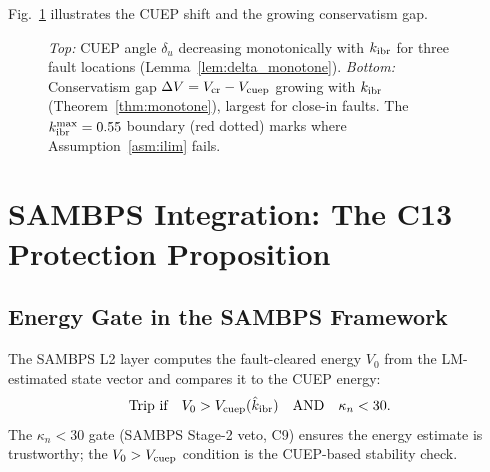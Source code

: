 \documentclass[journal]{IEEEtran}
\newcommand{\kibr}{k_{\rm ibr}}
\newcommand{\kappan}{\kappa_{n}}
\newcommand{\Vcuep}{V_{\rm cuep}}
\newcommand{\Vcr}{V_{\rm cr}}
\newcommand{\Vnaught}{V_0}
\newcommand{\deltau}{\delta_u}
\newcommand{\DeltaV}{\Delta V}
\begin{document}
Fig.~\ref{fig:cuep_shift} illustrates the CUEP shift and the
growing conservatism gap.

\begin{figure}[!t]
  \centering
  
  \caption{\emph{Top:} CUEP angle $\deltau$ decreasing monotonically
           with $\kibr$ for three fault locations (Lemma~\ref{lem:delta_monotone}).
           \emph{Bottom:} Conservatism gap $\DeltaV = \Vcr - \Vcuep$
           growing with $\kibr$ (Theorem~\ref{thm:monotone}), largest
           for close-in faults.  The $\kibr^{\max} = 0.55$ boundary
           (red dotted) marks where Assumption~\ref{asm:ilim} fails.}
  \label{fig:cuep_shift}
\end{figure}

\section{SAMBPS Integration: The C13 Protection Proposition}
\label{sec:sambps}

\subsection{Energy Gate in the SAMBPS Framework}

The SAMBPS L2 layer computes the fault-cleared energy $\Vnaught$ from
the LM-estimated state vector and compares it to the CUEP energy:
\begin{equation}
  \text{Trip if}\quad \Vnaught > \Vcuep(\hat\kibr)
  \quad\text{AND}\quad \kappan < 30.
  \label{eq:sambps_rule}
\end{equation}
The $\kappan < 30$ gate (SAMBPS Stage-2 veto, C9) ensures the
energy estimate is trustworthy; the $\Vnaught > \Vcuep$ condition
is the CUEP-based stability check.
\end{document}
